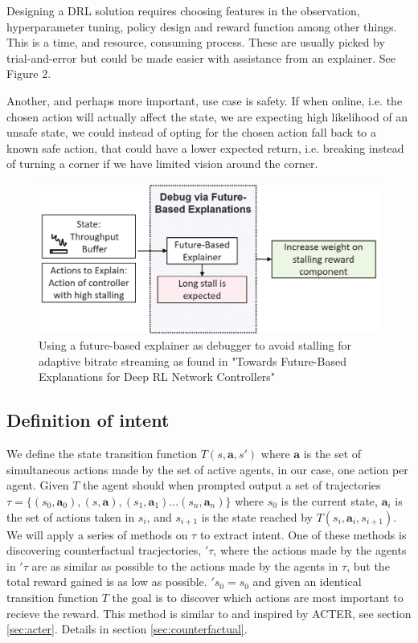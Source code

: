 \documentclass[UKenglish]{uiomasterthesis}
\begin{document}
Designing a DRL solution requires choosing features in the observation,\\ hyperparameter tuning, policy design and reward function among other things. This is a time, and resource, consuming process. These are usually picked by trial-and-error but could be made easier with assistance from an explainer. See Figure 2. 

Another, and perhaps more important, use case is safety. If when online, i.e. the chosen action will actually affect the state, we are expecting high likelihood of an unsafe state, we could instead of opting for the chosen action fall back to a known safe action, that could have a lower expected return, i.e. breaking instead of turning a corner if we have limited vision around the corner.

\begin{figure}
	\includegraphics[width=\textwidth]{images/dog-final.png}
	\caption{Using a future-based explainer as debugger to avoid stalling for adaptive bitrate streaming as found in "Towards Future-Based Explanations for Deep RL Network Controllers" \cite{10.1145/3626570.3626607}}
	\label{fig:environment}
\end{figure}
\medskip

\subsection{Definition of intent}
We define the state transition function $T(s, \textbf{a}, s')$ where $\textbf{a}$ is the set of simultaneous actions made by the set of active agents, in our case, one action per agent. Given $T$ the agent should when prompted output a set of trajectories $\tau = \{(s_0,\textbf{a}_0),(s,\textbf{a}),(s_1,\textbf{a}_1)...(s_n,\textbf{a}_n)\}$ where $s_0$ is the current state, $\textbf{a}_i$ is the set of actions taken in $s_i$, and $s_{i+1}$ is the state reached by $T(s_i,\textbf{a}_i, s_{i+1})$. We will apply a series of methods on $\tau$ to extract intent. One of these methods is discovering counterfactual tracjectories, $'\tau$, where the actions made by the agents in $'\tau$ are as similar as possible to the actions made by the agents in $\tau$, but the total reward gained is as low as possible. $'s_0 = s_0$ and given an identical transition function $T$ the goal is to discover which actions are most important to recieve the reward. This method is similar to and inspired by ACTER\cite{gajcin2024acter}, see section \ref{sec:acter}. Details in section \ref{sec:counterfactual}.
\end{document}
